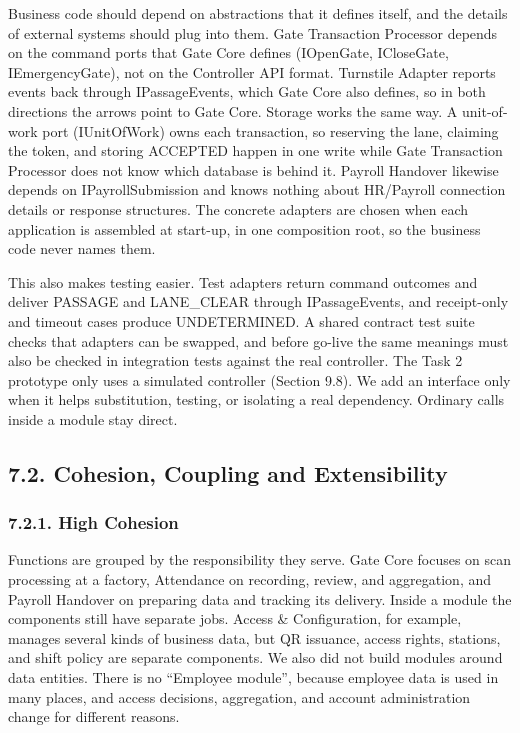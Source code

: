{}

Business code should depend on abstractions that it defines itself, and the details of external systems should plug into them. Gate Transaction Processor depends on the command ports that Gate Core defines (IOpenGate, ICloseGate, IEmergencyGate), not on the Controller API format. Turnstile Adapter reports events back through IPassageEvents, which Gate Core also defines, so in both directions the arrows point to Gate Core. Storage works the same way. A unit-of-work port (IUnitOfWork) owns each transaction, so reserving the lane, claiming the token, and storing ACCEPTED happen in one write while Gate Transaction Processor does not know which database is behind it. Payroll Handover likewise depends on IPayrollSubmission and knows nothing about HR/Payroll connection details or response structures. The concrete adapters are chosen when each application is assembled at start-up, in one composition root, so the business code never names them.

This also makes testing easier. Test adapters return command outcomes and deliver PASSAGE and LANE\_CLEAR through IPassageEvents, and receipt-only and timeout cases produce UNDETERMINED. A shared contract test suite checks that adapters can be swapped, and before go-live the same meanings must also be checked in integration tests against the real controller. The Task 2 prototype only uses a simulated controller (Section 9.8). We add an interface only when it helps substitution, testing, or isolating a real dependency. Ordinary calls inside a module stay direct.

\subsection*{7.2. Cohesion, Coupling and Extensibility}

{}

\subsubsection*{7.2.1. High Cohesion}

{}

Functions are grouped by the responsibility they serve. Gate Core focuses on scan processing at a factory, Attendance on recording, review, and aggregation, and Payroll Handover on preparing data and tracking its delivery. Inside a module the components still have separate jobs. Access \& Configuration, for example, manages several kinds of business data, but QR issuance, access rights, stations, and shift policy are separate components. We also did not build modules around data entities. There is no ``Employee module'', because employee data is used in many places, and access decisions, aggregation, and account administration change for different reasons.

